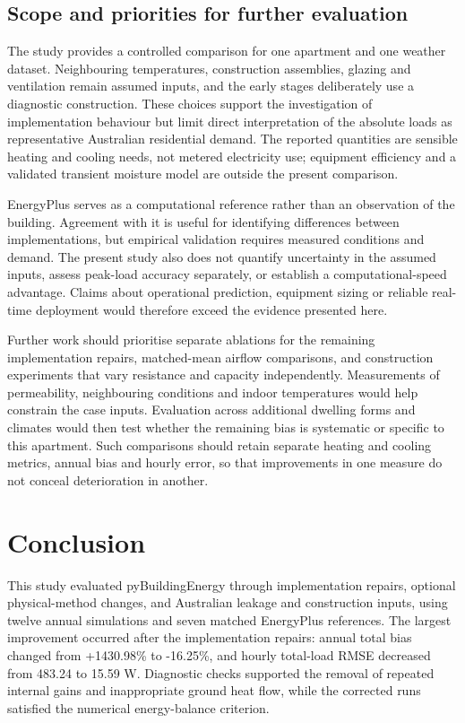 \subsection{Scope and priorities for further evaluation}

The study provides a controlled comparison for one apartment and one weather dataset. Neighbouring temperatures, construction assemblies, glazing and ventilation remain assumed inputs, and the early stages deliberately use a diagnostic construction. These choices support the investigation of implementation behaviour but limit direct interpretation of the absolute loads as representative Australian residential demand. The reported quantities are sensible heating and cooling needs, not metered electricity use; equipment efficiency and a validated transient moisture model are outside the present comparison.

EnergyPlus serves as a computational reference rather than an observation of the building. Agreement with it is useful for identifying differences between implementations, but empirical validation requires measured conditions and demand. The present study also does not quantify uncertainty in the assumed inputs, assess peak-load accuracy separately, or establish a computational-speed advantage. Claims about operational prediction, equipment sizing or reliable real-time deployment would therefore exceed the evidence presented here.

Further work should prioritise separate ablations for the remaining implementation repairs, matched-mean airflow comparisons, and construction experiments that vary resistance and capacity independently. Measurements of permeability, neighbouring conditions and indoor temperatures would help constrain the case inputs. Evaluation across additional dwelling forms and climates would then test whether the remaining bias is systematic or specific to this apartment. Such comparisons should retain separate heating and cooling metrics, annual bias and hourly error, so that improvements in one measure do not conceal deterioration in another.

\section{Conclusion}

This study evaluated pyBuildingEnergy through implementation repairs, optional physical-method changes, and Australian leakage and construction inputs, using twelve annual simulations and seven matched EnergyPlus references. The largest improvement occurred after the implementation repairs: annual total bias changed from +1430.98\% to -16.25\%, and hourly total-load RMSE decreased from 483.24 to 15.59 W. Diagnostic checks supported the removal of repeated internal gains and inappropriate ground heat flow, while the corrected runs satisfied the numerical energy-balance criterion.

